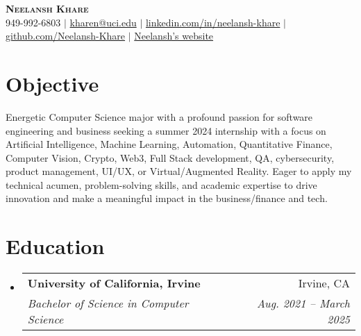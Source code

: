 \documentclass[letterpaper,11pt]{article}
\makeatletter
\newcommand{\resumeSubheading}[4]{
  \vspace{-2pt}\item
    \begin{tabular*}{0.97\textwidth}[t]{l@{\extracolsep{\fill}}r}
      \textbf{#1} & #2 \\
      \textit{\small#3} & \textit{\small #4} \\
    \end{tabular*}\vspace{-7pt}
}
\newcommand{\resumeSubHeadingListStart}{\begin{itemize}[leftmargin=0.15in, label={}]}
\newcommand{\resumeSubHeadingListEnd}{\end{itemize}}
\makeatother
\begin{document}
\begin{center}  
    \textbf{\Huge \scshape Neelansh Khare} \\ \vspace{1pt}
    \small 949-992-6803 $|$ \href{mailto:kharen@uci.edu}{{kharen@uci.edu}} $|$ 
    \href{https://linkedin.com/in/neelansh-khare}{{linkedin.com/in/neelansh-khare}} $|$
    \href{https://github.com/Neelansh-Khare}{{github.com/Neelansh-Khare}} $|$
    \href{https://neelanshkhare.notion.site/d518ba0af3604c1189da03c6ab047f3c}{{Neelansh's website}}
\end{center}

\section{Objective}
\begin{itemize}[leftmargin=0.15in, label={}]
  \small{\item{
   \textbf{}{Energetic Computer Science major with a profound passion for software engineering and business seeking a summer 2024 internship with a focus on Artificial Intelligence, Machine Learning, Automation, Quantitative Finance, Computer Vision, Crypto, Web3, Full Stack development, QA, cybersecurity, product management, UI/UX, or Virtual/Augmented Reality. Eager to apply my technical acumen, problem-solving skills, and academic expertise to drive innovation and make a meaningful impact in the business/finance and tech.} \\
  }}
  \end{itemize}


\section{Education}
  \resumeSubHeadingListStart
    \resumeSubheading
      {University of California, Irvine}{Irvine, CA}
      {Bachelor of Science in Computer Science}{Aug. 2021 -- March 2025}
  \resumeSubHeadingListEnd
  
\end{document}
